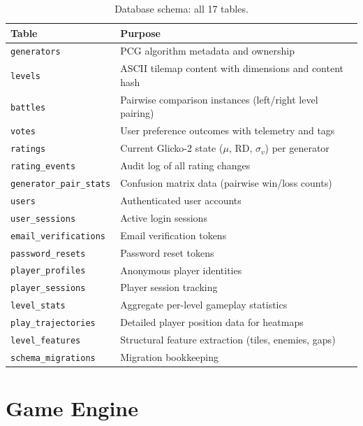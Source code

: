 \documentclass[shortabstract, mgr, english]{iithesis}
\begin{document}
\begin{table}[H]
\centering
\small
\begin{tabular}{ll}
\toprule
\textbf{Table} & \textbf{Purpose} \\
\midrule
\texttt{generators}          & PCG algorithm metadata and ownership \\
\texttt{levels}              & ASCII tilemap content with dimensions and content hash \\
\texttt{battles}             & Pairwise comparison instances (left/right level pairing) \\
\texttt{votes}               & User preference outcomes with telemetry and tags \\
\texttt{ratings}             & Current Glicko-2 state ($\mu$, RD, $\sigma_v$) per generator \\
\texttt{rating\_events}      & Audit log of all rating changes \\
\texttt{generator\_pair\_stats} & Confusion matrix data (pairwise win/loss counts) \\
\texttt{users}               & Authenticated user accounts \\
\texttt{user\_sessions}      & Active login sessions \\
\texttt{email\_verifications}& Email verification tokens \\
\texttt{password\_resets}    & Password reset tokens \\
\texttt{player\_profiles}    & Anonymous player identities \\
\texttt{player\_sessions}    & Player session tracking \\
\texttt{level\_stats}        & Aggregate per-level gameplay statistics \\
\texttt{play\_trajectories}  & Detailed player position data for heatmaps \\
\texttt{level\_features}     & Structural feature extraction (tiles, enemies, gaps) \\
\texttt{schema\_migrations}  & Migration bookkeeping \\
\bottomrule
\end{tabular}
\caption{Database schema: all 17 tables.}
\label{tab:db-tables}
\end{table}

\section{Game Engine}
\label{sec:sd-engine}
\end{document}
